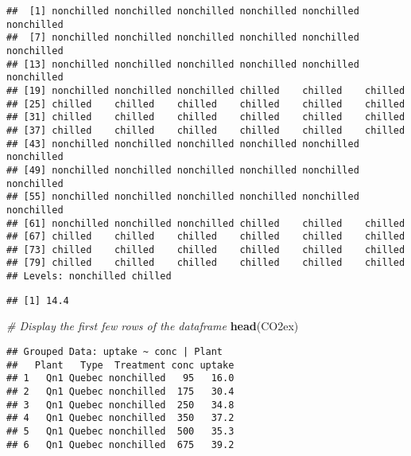 \documentclass[]{article}
\newenvironment{Shaded}{\begin{snugshade}}{\end{snugshade}}
\newcommand{\CommentTok}[1]{\textcolor[rgb]{0.56,0.35,0.01}{\textit{#1}}}
\newcommand{\DecValTok}[1]{\textcolor[rgb]{0.00,0.00,0.81}{#1}}
\newcommand{\KeywordTok}[1]{\textcolor[rgb]{0.13,0.29,0.53}{\textbf{#1}}}
\newcommand{\NormalTok}[1]{#1}
\newcommand{\OperatorTok}[1]{\textcolor[rgb]{0.81,0.36,0.00}{\textbf{#1}}}
\begin{document}
\begin{verbatim}
##  [1] nonchilled nonchilled nonchilled nonchilled nonchilled nonchilled
##  [7] nonchilled nonchilled nonchilled nonchilled nonchilled nonchilled
## [13] nonchilled nonchilled nonchilled nonchilled nonchilled nonchilled
## [19] nonchilled nonchilled nonchilled chilled    chilled    chilled   
## [25] chilled    chilled    chilled    chilled    chilled    chilled   
## [31] chilled    chilled    chilled    chilled    chilled    chilled   
## [37] chilled    chilled    chilled    chilled    chilled    chilled   
## [43] nonchilled nonchilled nonchilled nonchilled nonchilled nonchilled
## [49] nonchilled nonchilled nonchilled nonchilled nonchilled nonchilled
## [55] nonchilled nonchilled nonchilled nonchilled nonchilled nonchilled
## [61] nonchilled nonchilled nonchilled chilled    chilled    chilled   
## [67] chilled    chilled    chilled    chilled    chilled    chilled   
## [73] chilled    chilled    chilled    chilled    chilled    chilled   
## [79] chilled    chilled    chilled    chilled    chilled    chilled   
## Levels: nonchilled chilled
\end{verbatim}

\begin{Shaded}
\end{Shaded}

\begin{verbatim}
## [1] 14.4
\end{verbatim}

\begin{Shaded}
\begin{Highlighting}[]
\CommentTok{# Display the first few rows of the dataframe}
\KeywordTok{head}\NormalTok{(CO2ex)}
\end{Highlighting}
\end{Shaded}

\begin{verbatim}
## Grouped Data: uptake ~ conc | Plant
##   Plant   Type  Treatment conc uptake
## 1   Qn1 Quebec nonchilled   95   16.0
## 2   Qn1 Quebec nonchilled  175   30.4
## 3   Qn1 Quebec nonchilled  250   34.8
## 4   Qn1 Quebec nonchilled  350   37.2
## 5   Qn1 Quebec nonchilled  500   35.3
## 6   Qn1 Quebec nonchilled  675   39.2
\end{verbatim}
\end{document}

